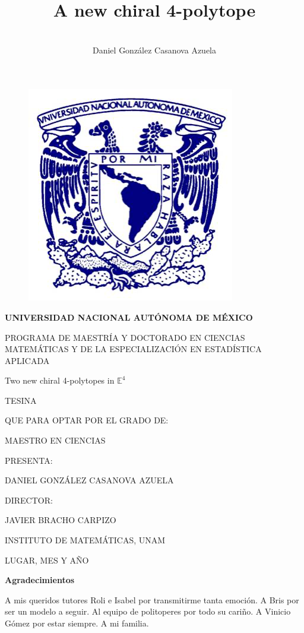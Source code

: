 \documentclass{article}
\title{A new chiral 4-polytope}
\author{\\Daniel González Casanova Azuela}
\date{}
\theoremstyle{definition}
\newcommand{\E}{\mathbb{E}}
\begin{document}
\thispagestyle{empty}
\begin{figure}[H]
	\centering
	\includegraphics[width=0.3\linewidth]{fig0}
\end{figure}

\begin{center}
	\textbf{UNIVERSIDAD NACIONAL AUTÓNOMA DE MÉXICO}
	
	PROGRAMA DE MAESTRÍA Y DOCTORADO EN CIENCIAS MATEMÁTICAS Y DE LA ESPECIALIZACIÓN EN ESTADÍSTICA APLICADA
	
	\vspace{2cm}
	{\Large Two new chiral 4-polytopes in $\E^4$}
	\vspace{1.2cm}
	
	TESINA
	
	QUE PARA OPTAR POR EL GRADO DE:
	
	MAESTRO EN CIENCIAS
	\vspace{1.2cm}
	
	PRESENTA:
	
	DANIEL GONZÁLEZ CASANOVA AZUELA
	\vspace{1.2cm}
	
	DIRECTOR:
	
	JAVIER BRACHO CARPIZO
	
	INSTITUTO DE MATEMÁTICAS, UNAM
	\vspace{1.2cm}
	
	LUGAR, MES Y AÑO
\end{center}

\clearpage

\begin{changemargin}{3.3cm}{0cm} 

\vspace*{4cm}

{\Large\textbf{Agradecimientos}}
\vspace{1cm}

A mis queridos tutores Roli e Isabel por transmitirme tanta emoción. A Bris por ser un modelo a seguir. Al equipo de politoperes por todo su cariño. A Vinicio Gómez por estar siempre. A mi familia.
\end{changemargin}
\clearpage
	
\end{document}
